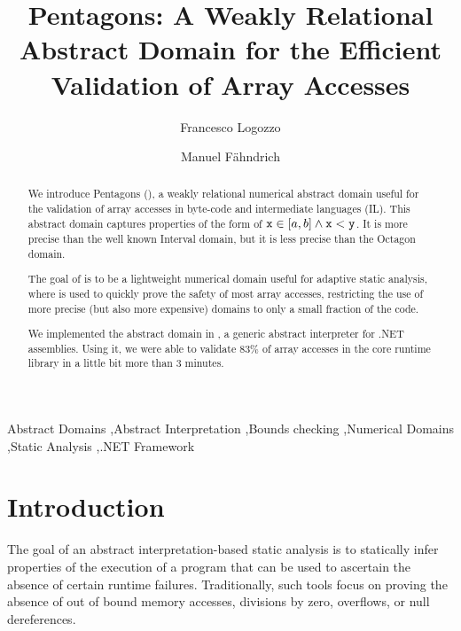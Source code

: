 \documentclass{elsart}
\begin{document}
\begin{frontmatter}

\title{Pentagons: A Weakly Relational Abstract Domain for the Efficient Validation of Array Accesses}

\author{Francesco Logozzo}
\address{Microsoft Research, Redmond, WA, USA}

\author{Manuel F\"ahndrich}
\address{Microsoft Research, Redmond, WA, USA}


\begin{abstract}
We introduce Pentagons (\Pentagons),  a weakly relational numerical abstract
domain useful for the validation of array accesses in byte-code and
intermediate languages (IL).
This abstract domain captures properties of the form of $\mathtt{x} \in [a, b] \wedge \mathtt{x} < \mathtt{y}$.
It is more precise than the well known Interval
domain, but it is less precise than the Octagon domain.

The goal of \Pentagons{} is to be a lightweight numerical domain useful
for adaptive static analysis, where \Pentagons{} 
is used to quickly prove the safety of most array accesses, restricting the use of
more precise (but also more expensive) domains to only a small fraction of the code.

We implemented the \Pentagons{} abstract domain in \Clousot, a generic
abstract interpreter for .NET assemblies. Using it, we were able to
validate $83\%$ of array accesses in the core runtime library
 in a little bit more than 3 minutes.
\end{abstract}


\begin{keyword}
Abstract Domains \sep Abstract Interpretation \sep Bounds checking \sep Numerical Domains \sep Static Analysis \sep .NET Framework
\end{keyword}

\end{frontmatter}

\section{Introduction}
The goal of an abstract interpretation-based static analysis is to
statically infer properties of the execution of a program that can be
used to ascertain the absence of certain runtime failures.
Traditionally, such tools focus on proving the absence of out of bound memory accesses, 
divisions by zero, overflows, or null dereferences.
\end{document}
